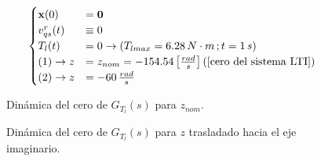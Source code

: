 \documentclass[a4paper, 10pt, onecolumn,journal]{ieeeconf}
\begin{document}
\begin{equation}
    \begin{cases}
        \mathbf{x}(0) &= \mathbf{0}\\
        v^r_{qs}(t) &\equiv 0\\
        T_l(t) &= 0 \rightarrow  \left(T_{lmax} = 6.28 \, N \cdot m\,; t = 1\,s\right)\\
        \left(1\right)\rightarrow z &= z_{nom} = -154.54\left[\frac{rad}{s}\right]\left(\cref{cero del sistema LTI}\right)\\
	    \left(2\right)\rightarrow z &= -60\,\frac{rad}{s}
    \end{cases}
	\label{condiciones simulacion dinamica de ceros}
\end{equation}
 
\begin{figure}[H]
	\centering
	\begin{adjustbox}{max width=\columnwidth}
	\end{adjustbox}
	\caption{Dinámica del cero de $G_{T_l}(s)$ para $z_{nom}$.}
	\label{dinámica de cero nominal}
\end{figure}

\begin{figure}[H]
	\centering
	\begin{adjustbox}{max width=\columnwidth}
	\end{adjustbox}
	\caption{Dinámica del cero de $G_{T_l}(s)$ para $z$ trasladado hacia el eje imaginario.}
	\label{dinámica de cero exagerada}
\end{figure}
\end{document}
